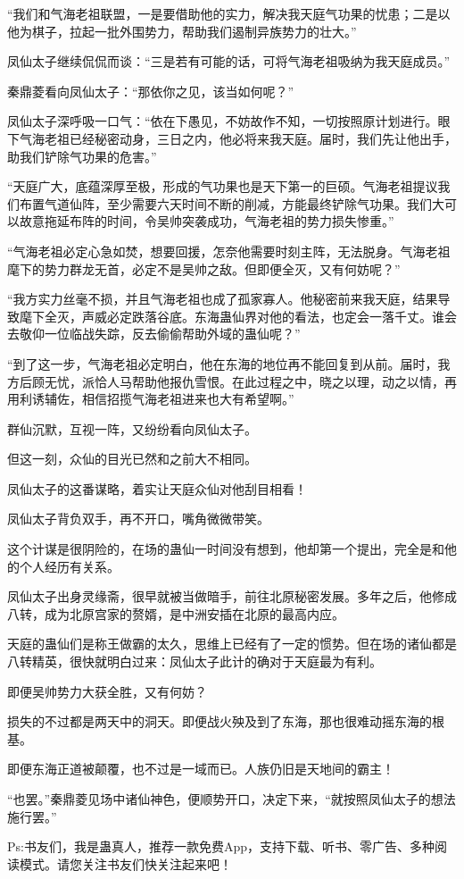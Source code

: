 \begin{this_body}
“我们和气海老祖联盟，一是要借助他的实力，解决我天庭气功果的忧患；二是以他为棋子，拉起一批外围势力，帮助我们遏制异族势力的壮大。”

凤仙太子继续侃侃而谈：“三是若有可能的话，可将气海老祖吸纳为我天庭成员。”

秦鼎菱看向凤仙太子：“那依你之见，该当如何呢？”

凤仙太子深呼吸一口气：“依在下愚见，不妨故作不知，一切按照原计划进行。眼下气海老祖已经秘密动身，三日之内，他必将来我天庭。届时，我们先让他出手，助我们铲除气功果的危害。”

“天庭广大，底蕴深厚至极，形成的气功果也是天下第一的巨硕。气海老祖提议我们布置气道仙阵，至少需要六天时间不断的削减，方能最终铲除气功果。我们大可以故意拖延布阵的时间，令吴帅突袭成功，气海老祖的势力损失惨重。”

“气海老祖必定心急如焚，想要回援，怎奈他需要时刻主阵，无法脱身。气海老祖麾下的势力群龙无首，必定不是吴帅之敌。但即便全灭，又有何妨呢？”

“我方实力丝毫不损，并且气海老祖也成了孤家寡人。他秘密前来我天庭，结果导致麾下全灭，声威必定跌落谷底。东海蛊仙界对他的看法，也定会一落千丈。谁会去敬仰一位临战失踪，反去偷偷帮助外域的蛊仙呢？”

“到了这一步，气海老祖必定明白，他在东海的地位再不能回复到从前。届时，我方后顾无忧，派恰人马帮助他报仇雪恨。在此过程之中，晓之以理，动之以情，再用利诱辅佐，相信招揽气海老祖进来也大有希望啊。”

群仙沉默，互视一阵，又纷纷看向凤仙太子。

但这一刻，众仙的目光已然和之前大不相同。

凤仙太子的这番谋略，着实让天庭众仙对他刮目相看！

凤仙太子背负双手，再不开口，嘴角微微带笑。

这个计谋是很阴险的，在场的蛊仙一时间没有想到，他却第一个提出，完全是和他的个人经历有关系。

凤仙太子出身灵缘斋，很早就被当做暗手，前往北原秘密发展。多年之后，他修成八转，成为北原宫家的赘婿，是中洲安插在北原的最高内应。

天庭的蛊仙们是称王做霸的太久，思维上已经有了一定的惯势。但在场的诸仙都是八转精英，很快就明白过来：凤仙太子此计的确对于天庭最为有利。

即便吴帅势力大获全胜，又有何妨？

损失的不过都是两天中的洞天。即便战火殃及到了东海，那也很难动摇东海的根基。

即便东海正道被颠覆，也不过是一域而已。人族仍旧是天地间的霸主！

“也罢。”秦鼎菱见场中诸仙神色，便顺势开口，决定下来，“就按照凤仙太子的想法施行罢。”

Ps:书友们，我是蛊真人，推荐一款免费App，支持下载、听书、零广告、多种阅读模式。请您关注书友们快关注起来吧！

\end{this_body}

